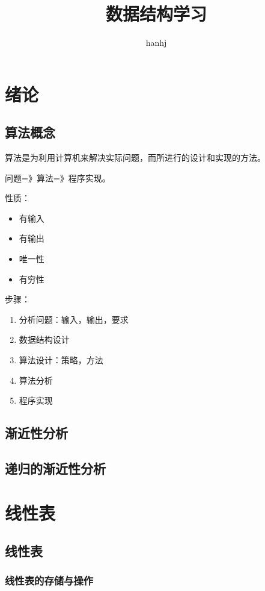 \documentclass{article}
\begin{document}
\title{数据结构学习}
\author{hanhj}
\maketitle
\newpage
\tableofcontents
\newpage
\section{绪论}
\subsection{算法概念}
	\par
	算法是为利用计算机来解决实际问题，而所进行的设计和实现的方法。
	\par
	问题=》算法=》程序实现。\\
	\par
	性质：
	\begin{itemize}
		\item 有输入
		\item 有输出
		\item 唯一性
		\item 有穷性
	\end{itemize}	
	\par
	步骤：
	\begin{enumerate}
		\item 分析问题：输入，输出，要求
		\item 数据结构设计
		\item 算法设计：策略，方法
		\item 算法分析
		\item 程序实现 
	\end{enumerate}
			
\subsection{渐近性分析}
\subsection{递归的渐近性分析}
\section{线性表}
\subsection{线性表}
\subsubsection{线性表的存储与操作}
\end{document}
